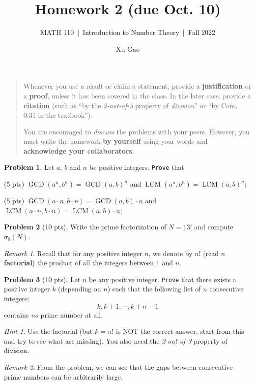 \documentclass[11pt]{article}
\title{Homework 2 (due Oct. 10)}
\author{Xu Gao}
\subtitle{MATH 110~|~Introduction to Number Theory~|~Fall 2022}
\date{}
\theoremstyle{plain}
\theoremstyle{definition}
\newtheorem{problem}{Problem}
\theoremstyle{remark}
\newtheorem*{remark}{Remark}
\newtheorem*{hint}{Hint}
\numberwithin{equation}{problem}
\DeclareMathOperator*\GCD{GCD}
\DeclareMathOperator*\LCM{LCM}
\begin{document}
\maketitle

\begin{quotation}
	Whenever you use a result or claim a statement, provide a \textbf{justification} or a \textbf{proof}, unless it has been covered in the class. In the later case, provide a \textbf{citation} (such as ``by the \emph{2-out-of-3} property of \emph{division}'' or ``by Coro. 0.31 in the textbook'').

	You are encouraged to \emph{discuss} the problems with your peers. However, you must write the homework \textbf{by yourself} using your words and \textbf{acknowledge your collaborators}.
\end{quotation}

\begin{problem}
	Let $a$, $b$ and $n$ be positive integers. \texttt{Prove} that 
	\begin{listinprob}
		\item (5 pts) $\GCD(a^n,b^n) = \GCD(a,b)^n$ and $\LCM(a^n,b^n) = \LCM(a,b)^n$;
		\item (5 pts) $\GCD(a\cdot n,b\cdot n) = \GCD(a,b)\cdot n$ and $\LCM(a\cdot n,b\cdot n) = \LCM(a,b)\cdot n$;
	\end{listinprob}
\end{problem}

\begin{problem}[10 pts]
	Write the prime factorization of $N = 13!$ and compute $\sigma_{0}(N)$.
	\begin{remark}
		Recall that for any positive integer $n$, we denote by $n!$ (read \textbf{$n$ factorial}) the product of all the integers between $1$ and $n$.
	\end{remark}
\end{problem}

\begin{problem}[10 pts]
	Let $n$ be any positive integer. \texttt{Prove} that there exists a positive integer $k$ (depending on $n$) such that the following list of $n$ consecutive integers:
	\[
		k, k + 1, \cdots, k + n - 1
	\]
	contains \emph{no} prime number at all.
	\begin{hint}
		Use the factorial (but $k=n!$ is NOT the correct answer, start from this and try to see what are missing). You also need the \emph{2-out-of-3} property of division.
	\end{hint}
	\begin{remark}
		From the problem, we can see that the gaps between consecutive prime numbers can be arbitrarily large.
	\end{remark}
\end{problem}
\end{document}
